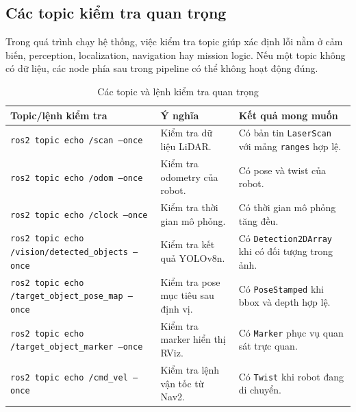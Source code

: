 \subsection{Các topic kiểm tra quan trọng}
\label{subsec:important-topics}

Trong quá trình chạy hệ thống, việc kiểm tra topic giúp xác định lỗi nằm ở cảm biến, perception, localization, navigation hay mission logic. Nếu một topic không có dữ liệu, các node phía sau trong pipeline có thể không hoạt động đúng.

\begin{table}[H]
    \centering
    \caption{Các topic và lệnh kiểm tra quan trọng}
    \label{tab:important-topics}
    \renewcommand{\arraystretch}{1.25}
    \small
    \begin{tabularx}{\textwidth}{|>{\raggedright\arraybackslash}p{}|>{\raggedright\arraybackslash}p{}|>{\raggedright\arraybackslash}X|}
        \hline
        \textbf{Topic/lệnh kiểm tra} & \textbf{Ý nghĩa} & \textbf{Kết quả mong muốn} \\
        \hline
        \texttt{ros2 topic echo /scan --once} & Kiểm tra dữ liệu LiDAR. & Có bản tin \texttt{LaserScan} với mảng \texttt{ranges} hợp lệ. \\
        \hline
        \texttt{ros2 topic echo /odom --once} & Kiểm tra odometry của robot. & Có pose và twist của robot. \\
        \hline
        \texttt{ros2 topic echo /clock --once} & Kiểm tra thời gian mô phỏng. & Có thời gian mô phỏng tăng đều. \\
        \hline
        \texttt{ros2 topic echo /vision/detected\_objects --once} & Kiểm tra kết quả YOLOv8n. & Có \texttt{Detection2DArray} khi có đối tượng trong ảnh. \\
        \hline
        \texttt{ros2 topic echo /target\_object\_pose\_map --once} & Kiểm tra pose mục tiêu sau định vị. & Có \texttt{PoseStamped} khi bbox và depth hợp lệ. \\
        \hline
        \texttt{ros2 topic echo /target\_object\_marker --once} & Kiểm tra marker hiển thị RViz. & Có \texttt{Marker} phục vụ quan sát trực quan. \\
        \hline
        \texttt{ros2 topic echo /cmd\_vel --once} & Kiểm tra lệnh vận tốc từ Nav2. & Có \texttt{Twist} khi robot đang di chuyển. \\
        \hline
    \end{tabularx}
\end{table}


